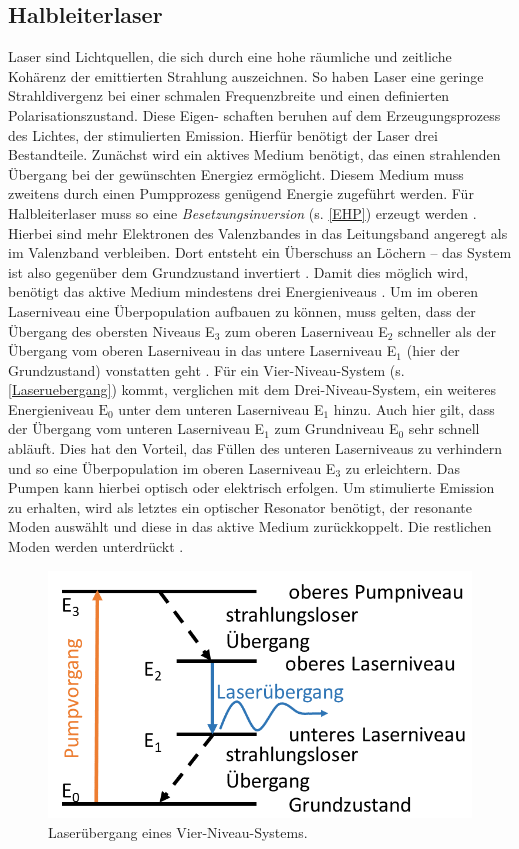 \subsection{Halbleiterlaser}
\label{HLLaser}
Laser sind Lichtquellen, die sich durch eine hohe räumliche und zeitliche Kohärenz der emittierten Strahlung auszeichnen. So haben Laser eine geringe Strahldivergenz bei einer schmalen Frequenzbreite und einen definierten Polarisationszustand. Diese Eigen- schaften beruhen auf dem Erzeugungsprozess des Lichtes, der stimulierten Emission. Hierfür benötigt der Laser drei Bestandteile. Zunächst wird ein aktives Medium benötigt, das einen strahlenden Übergang bei der gewünschten Energiez ermöglicht. Diesem Medium muss zweitens durch einen Pumpprozess genügend Energie zugeführt werden. Für Halbleiterlaser muss so eine \textit{Besetzungsinversion} (s. \autoref{EHP}) erzeugt werden \cite{Kneubuhl.2008}. Hierbei sind mehr Elektronen des Valenzbandes in das Leitungsband angeregt als im Valenzband verbleiben. Dort entsteht ein Überschuss an Löchern – das System ist also gegenüber dem Grundzustand invertiert \cite{Kneubuhl.2008}. Damit dies möglich wird, benötigt das aktive Medium mindestens drei Energieniveaus \cite{Eichhorn.2013}. Um im oberen Laserniveau eine Überpopulation aufbauen zu können, muss gelten, dass der Übergang des obersten Niveaus E$_\text{3}$ zum oberen Laserniveau E$_\text{2}$ schneller  als der Übergang vom oberen Laserniveau in das untere Laserniveau E$_\text{1}$ (hier der Grundzustand) vonstatten geht \cite{Kneubuhl.2008}. Für ein Vier-Niveau-System (s. \autoref{Laseruebergang}) kommt, verglichen mit dem Drei-Niveau-System, ein weiteres Energieniveau $\text{E}_\text{0}$ unter dem unteren Laserniveau E$_\text{1}$ hinzu. Auch hier gilt, dass der Übergang vom unteren Laserniveau E$_\text{1}$ zum Grundniveau E$_\text{0}$ sehr schnell abläuft. Dies hat den Vorteil, das Füllen des unteren Laserniveaus zu verhindern und so eine Überpopulation im oberen Laserniveau E$_\text{3}$ zu erleichtern. Das Pumpen kann hierbei optisch oder elektrisch erfolgen. Um stimulierte Emission zu erhalten, wird als letztes ein optischer Resonator benötigt, der resonante Moden auswählt und diese in das aktive Medium zurückkoppelt. Die restlichen Moden werden unterdrückt \cite{Kneubuhl.2008}.
\begin{figure}[h]
\includegraphics[width=.4\textwidth]{Bilder/Vorbetrachtung/Laseruebergang}
\caption{Laserübergang eines Vier-Niveau-Systems.}
\label{Laseruebergang}
\end{figure}
